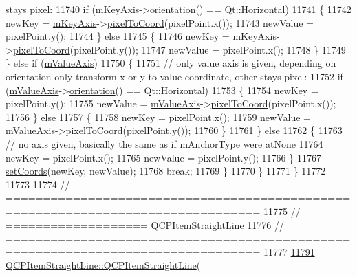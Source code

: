 \begin{DoxyCode}
{       stays pixel:}
11740         \textcolor{keywordflow}{if} (\hyperlink{a00038_a05b13a027fd0b07663fd70b8ab1c8842}{mKeyAxis}->\hyperlink{a00025_a57483f2f60145ddc9e63f3af53959265}{orientation}() == Qt::Horizontal)
11741         \{
11742           newKey = \hyperlink{a00038_a05b13a027fd0b07663fd70b8ab1c8842}{mKeyAxis}->\hyperlink{a00025_ae9289ef7043b9d966af88eaa95b037d1}{pixelToCoord}(pixelPoint.x());
11743           newValue = pixelPoint.y();
11744         \} \textcolor{keywordflow}{else}
11745         \{
11746           newKey = \hyperlink{a00038_a05b13a027fd0b07663fd70b8ab1c8842}{mKeyAxis}->\hyperlink{a00025_ae9289ef7043b9d966af88eaa95b037d1}{pixelToCoord}(pixelPoint.y());
11747           newValue = pixelPoint.x();
11748         \}
11749       \} \textcolor{keywordflow}{else} \textcolor{keywordflow}{if} (\hyperlink{a00038_acd281f6bd352758ff00d852f1f0fa06f}{mValueAxis})
11750       \{
11751         \textcolor{comment}{// only value axis is given, depending on orientation only transform x or y to value coordinate,
       other stays pixel:}
11752         \textcolor{keywordflow}{if} (\hyperlink{a00038_acd281f6bd352758ff00d852f1f0fa06f}{mValueAxis}->\hyperlink{a00025_a57483f2f60145ddc9e63f3af53959265}{orientation}() == Qt::Horizontal)
11753         \{
11754           newKey = pixelPoint.y();
11755           newValue = \hyperlink{a00038_acd281f6bd352758ff00d852f1f0fa06f}{mValueAxis}->\hyperlink{a00025_ae9289ef7043b9d966af88eaa95b037d1}{pixelToCoord}(pixelPoint.x());
11756         \} \textcolor{keywordflow}{else}
11757         \{
11758           newKey = pixelPoint.x();
11759           newValue = \hyperlink{a00038_acd281f6bd352758ff00d852f1f0fa06f}{mValueAxis}->\hyperlink{a00025_ae9289ef7043b9d966af88eaa95b037d1}{pixelToCoord}(pixelPoint.y());
11760         \}
11761       \} \textcolor{keywordflow}{else}
11762       \{
11763         \textcolor{comment}{// no axis given, basically the same as if mAnchorType were atNone}
11764         newKey = pixelPoint.x();
11765         newValue = pixelPoint.y();
11766       \}
11767       \hyperlink{a00038_aa988ba4e87ab684c9021017dcaba945f}{setCoords}(newKey, newValue);
11768       \textcolor{keywordflow}{break};
11769     \}
11770   \}
11771 \}
11772 
11773 
11774 \textcolor{comment}{// ================================================================================}
11775 \textcolor{comment}{// =================== QCPItemStraightLine}
11776 \textcolor{comment}{// ================================================================================}
11777 
\hypertarget{a00115_source_l11791}{}\hyperlink{a00040_a41fd2e1f006983449eca9830930c3b10}{11791} \hyperlink{a00040_a41fd2e1f006983449eca9830930c3b10}{QCPItemStraightLine::QCPItemStraightLine}(

\end{DoxyCode}
